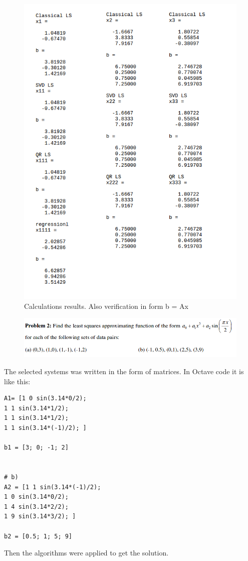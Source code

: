 \documentclass[eng,openany]{mgr}
\begin{document}
\begin{figure}[h]
\centering
\includegraphics[width=0.7\linewidth]{screenshot003}
\caption{Calculations results. Also verification in form b = Ax}
\label{fig:screenshot003}
\end{figure}
\hspace{40pt}
\newpage
\begin{figure}[h]
\centering
\includegraphics[width=0.7\linewidth]{screenshot004}
\label{fig:screenshot004}
\end{figure}

The selected systems was written in the form of matrices. In Octave code it is like this:
\begin{lstlisting}
A1= [1 0 sin(3.14*0/2);
1 1 sin(3.14*1/2);
1 1 sin(3.14*1/2);
1 1 sin(3.14*(-1)/2); ]

b1 = [3; 0; -1; 2]


# b)
A2 = [1 1 sin(3.14*(-1)/2);
1 0 sin(3.14*0/2);
1 4 sin(3.14*2/2);
1 9 sin(3.14*3/2); ]

b2 = [0.5; 1; 5; 9]
\end{lstlisting}
Then the algorithms were applied to get the solution.
\end{document}
